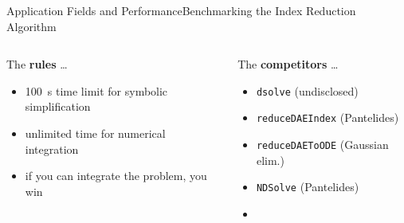 \begin{frame}{Application Fields and Performance}{Benchmarking the Index Reduction Algorithm}
  \vspace{-1.0em}
  \begin{columns}
    \begin{column}[t]{0.5\textwidth}
      The \textbf{rules} \dots
      \begin{itemize}\small
        \setlength{\itemsep}{0.0em}
        \item[\raisebox{-1pt}{\scalebox{0.8}{\faHourglassHalf}\,}] \SI{100}{\second} time limit for symbolic simplification
        \item[\raisebox{-1pt}{\scalebox{0.8}{\faInfinity}}] unlimited time for numerical integration
        \item[\raisebox{-1pt}{\scalebox{0.8}{\faCheck}}] if you can integrate the problem, you win
      \end{itemize}
    \end{column}
    \begin{column}[t]{0.5\textwidth}
      The \textbf{competitors} \dots \\
      \begin{itemize}\small
        \setlength{\itemsep}{0.0em}
        \item \Maple{} \texttt{dsolve} (undisclosed)
        \item \Matlab{} \texttt{reduceDAEIndex} (Pantelides)
        \item \Matlab{} \texttt{reduceDAEToODE} (Gaussian elim.)
        \item \Mathematica{} \texttt{NDSolve} (Pantelides)
        \item {}
      \end{itemize}
    \end{column}
  \end{columns}
  \vspace{0.5em}%
\end{frame}
